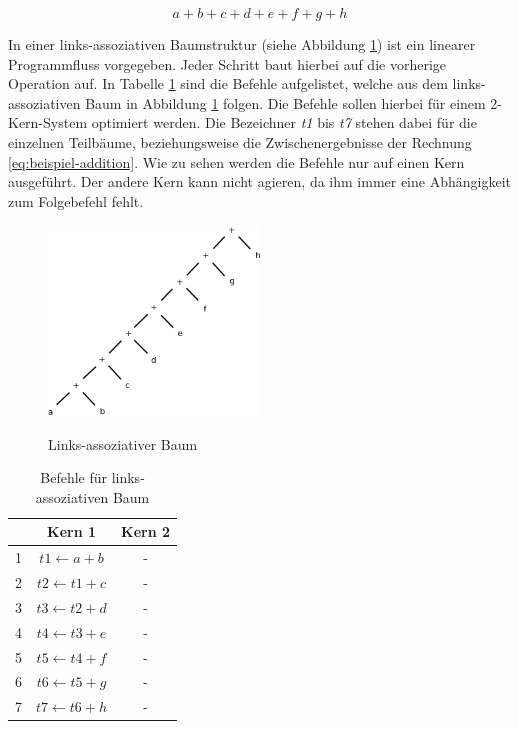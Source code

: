 \begin{equation} \label{eq:beispiel-addition}
a + b + c + d + e + f + g + h
\end{equation}

In einer links-assoziativen Baumstruktur (siehe Abbildung \ref{fig:links-assoziativer-baum}\cite{HeBIS-309344573}) ist ein linearer Programmfluss vorgegeben. Jeder Schritt baut hierbei auf die vorherige Operation auf. In Tabelle \ref{tab:links-assoziativer-baum}\cite{HeBIS-309344573} sind die Befehle aufgelistet, welche aus dem links-assoziativen Baum in Abbildung \ref{fig:links-assoziativer-baum} folgen. Die Befehle sollen hierbei für einem 2-Kern-System optimiert werden. Die Bezeichner \textit{t1} bis \textit{t7} stehen dabei für die einzelnen Teilbäume, beziehungsweise die Zwischenergebnisse der Rechnung \ref{eq:beispiel-addition}. Wie zu sehen werden die Befehle nur auf einen Kern ausgeführt. Der andere Kern kann nicht agieren, da ihm immer eine Abhängigkeit zum Folgebefehl fehlt.

\begin{figure}
	\begin{center}
		\includegraphics[width=0.5\textwidth]{images/links_assoziativer_baum}\\
	\end{center}
	\caption{Links-assoziativer Baum}
	\label{fig:links-assoziativer-baum}
\end{figure}

\begin{table}
	\begin{center}
		\begin{tabular}{|c|c|c|}
			\hline  & Kern 1 & Kern 2 \\ 
			\hline 1 & $ t1 \leftarrow a + b $& - \\ 
			\hline 2 & $ t2 \leftarrow t1 + c $& - \\ 
			\hline 3 & $ t3 \leftarrow t2 + d $& - \\ 
			\hline 4 & $ t4 \leftarrow t3 + e $& - \\ 
			\hline 5 & $ t5 \leftarrow t4 + f $& - \\ 
			\hline 6 & $ t6 \leftarrow t5 + g $& - \\ 
			\hline 7 & $ t7 \leftarrow t6 + h $& - \\ 
			\hline 
		\end{tabular}
	\end{center}
	\caption{Befehle für links-assoziativen Baum}
	\label{tab:links-assoziativer-baum}
\end{table}


